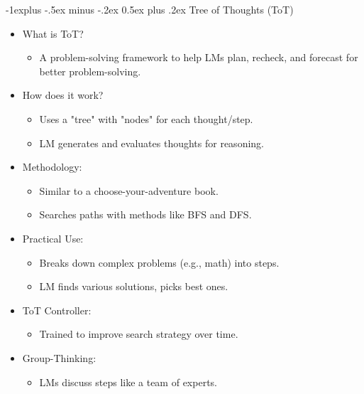 \documentclass[10pt,landscape]{article}
\makeatletter
\renewcommand{\subsection}{\@startsection{subsection}{2}{0mm}%
                                {-1explus -.5ex minus -.2ex}%
                                {0.5ex plus .2ex}%
                                {\normalfont\normalsize\bfseries}}
\makeatother
\begin{document}
\begin{multicols}{3}
\subsection{Tree of Thoughts (ToT)}
\begin{itemize}
    \item What is ToT?
    \begin{itemize}
        \item A problem-solving framework to help LMs plan, recheck, and forecast for better problem-solving.
    \end{itemize}
    \item How does it work?
    \begin{itemize}
        \item Uses a "tree" with "nodes" for each thought/step.
        \item LM generates and evaluates thoughts for reasoning.
    \end{itemize}
    \item Methodology:
    \begin{itemize}
        \item Similar to a choose-your-adventure book.
        \item Searches paths with methods like BFS and DFS.
    \end{itemize}
    \item Practical Use:
    \begin{itemize}
        \item Breaks down complex problems (e.g., math) into steps.
        \item LM finds various solutions, picks best ones.
    \end{itemize}
    \item ToT Controller:
    \begin{itemize}
        \item Trained to improve search strategy over time.
    \end{itemize}
    \item Group-Thinking:
    \begin{itemize}
        \item LMs discuss steps like a team of experts.
    \end{itemize}
\end{itemize}


\end{multicols}
\end{document}
